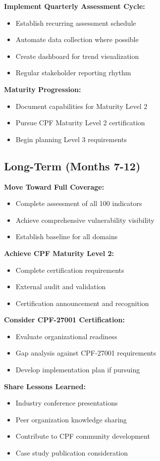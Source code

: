 \documentclass[11pt,a4paper]{article}
\begin{document}
\textbf{Implement Quarterly Assessment Cycle:}
\begin{itemize}
\item Establish recurring assessment schedule
\item Automate data collection where possible
\item Create dashboard for trend visualization
\item Regular stakeholder reporting rhythm
\end{itemize}

\textbf{Maturity Progression:}
\begin{itemize}
\item Document capabilities for Maturity Level 2
\item Pursue CPF Maturity Level 2 certification
\item Begin planning Level 3 requirements
\end{itemize}

\subsection{Long-Term (Months 7-12)}

\textbf{Move Toward Full Coverage:}
\begin{itemize}
\item Complete assessment of all 100 indicators
\item Achieve comprehensive vulnerability visibility
\item Establish baseline for all domains
\end{itemize}

\textbf{Achieve CPF Maturity Level 2:}
\begin{itemize}
\item Complete certification requirements
\item External audit and validation
\item Certification announcement and recognition
\end{itemize}

\textbf{Consider CPF-27001 Certification:}
\begin{itemize}
\item Evaluate organizational readiness
\item Gap analysis against CPF-27001 requirements
\item Develop implementation plan if pursuing
\end{itemize}

\textbf{Share Lessons Learned:}
\begin{itemize}
\item Industry conference presentations
\item Peer organization knowledge sharing
\item Contribute to CPF community development
\item Case study publication consideration
\end{itemize}
\end{document}
